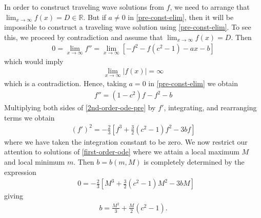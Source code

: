 \documentclass[12pt,reqno]{amsart}
\numberwithin{equation}{section}  %
\newcommand{\rr}{\mathbb{R}}
\begin{document}
%
%
In order to construct traveling wave solutions from $f$, we need to arrange that
$\lim_{x \to \infty} f(x) = D \in \rr$. But if $a \neq 0$ in
\eqref{pre-const-elim}, then it will be impossible to construct a traveling wave
solution using \eqref{pre-const-elim}. To see this, we proceed by contradiction
and assume that $\lim_{x \to
\infty} f(x) = D$. Then
%
%
\begin{equation*}
\begin{split}
  0 = \lim_{x \to \infty} f'' = \lim_{x \to \infty} [-f^{2} -f(c^{2}-1) - ax -b]
\end{split}
\end{equation*}
%
%
which would imply
%
%
\begin{equation*}
\begin{split}
  \lim_{x \to \infty} | f(x) |  = \infty
\end{split}
\end{equation*}
%
%
which is a contradiction. Hence, taking $a = 0$ in \eqref{pre-const-elim} we
obtain
%
\begin{equation}
  \label{2nd-order-ode-pre}
\begin{split}
  f'' = (1-c^{2})f - f^{2} -b 
\end{split}
\end{equation}
%
%
Multiplying both sides of \eqref{2nd-order-ode-pre} by $f'$, integrating, and rearranging terms we obtain 
%
\begin{equation}
  \label{first-order-ode}
\begin{split}
  (f')^{2} = -\frac{2}{3} \left [ f^{3} + \frac{3}{2} (c^{2}-1)f^{2} -3bf 
  \right ]
\end{split}
\end{equation}
%
%
where we have taken the integration constant to be zero. 
We now restrict our attention to solutions of \eqref{first-order-ode} where
we attain a local maximum $M$ and local minimum $m$. Then $b = b(m, M)$ is
completely determined by the expression
%
%
\begin{equation*}
\begin{split}
& 0 = -\frac{2}{3} \left [ M^{3} + \frac{3}{2} (c^{2} -1)M^{2} -3bM  
  \right ]
\end{split}
\end{equation*}
%
giving
%
%
\begin{equation}
  \label{b-val}
\begin{split}
  b = \frac{M^{2}}{3} + \frac{M}{2}(c^{2}-1).
\end{split}
\end{equation}
\end{document}
